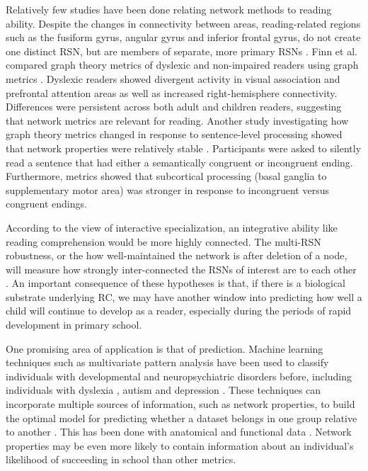 Relatively few studies have been done relating network methods to reading ability. Despite the changes in connectivity between areas, reading-related regions such as the fusiform gyrus, angular gyrus and inferior frontal gyrus, do not create one distinct RSN, but are members of separate, more primary RSNs \cite{Vogel2013}. Finn et al. compared graph theory metrics of dyslexic and non-impaired readers using graph metrics \cite{Finn2014}. Dyslexic readers showed divergent activity in visual association and prefrontal attention areas as well as increased right-hemisphere connectivity. Differences were persistent across both adult and children readers, suggesting that network metrics are relevant for reading. Another study investigating how graph theory metrics changed in response to sentence-level processing showed that network properties were relatively stable \cite{Ye2012}. Participants were asked to silently read a sentence that had either a semantically congruent or incongruent ending. Furthermore, metrics showed that subcortical processing (basal ganglia to supplementary motor area) was stronger in response to incongruent versus congruent endings. 

According to the view of interactive specialization, an integrative ability like reading comprehension would be more highly connected. The multi-RSN robustness, or the how well-maintained the network is after deletion of a node, will measure how strongly inter-connected the RSNs of interest are to each other \cite{Bullmore2009}. An important consequence of these hypotheses is that, if there is a biological substrate underlying RC, we may have another window into predicting how well a child will continue to develop as a reader, especially during the periods of rapid development in primary school.

One promising area of application is that of prediction. Machine learning techniques such as multivariate pattern analysis have been used to classify individuals with developmental and neuropsychiatric disorders before, including individuals with dyslexia \cite{Ecker2010, Hoeft2011, Wee2014, Hoeft2007, Ingalhalikar2014}, autism and depression \cite{Lord2012}.  These techniques can incorporate multiple sources of information, such as network properties, to build the optimal model for predicting whether a dataset belongs in one group relative to another \cite{Pereira2009}. This has been done with anatomical and functional data \cite{Hoeft2007, Hoeft2007b}. Network properties may be even more likely to contain information about an individual's likelihood of succeeding in school than other metrics.

